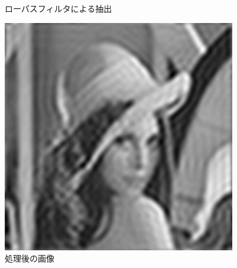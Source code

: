\begin{figure}[h]
\begin{minipage}{.25\hsize}
    \caption{ローパスフィルタによる抽出}
    \label{fig:low_pass_dft}
  \end{minipage}
  \begin{minipage}{.25\hsize}
    \includegraphics[clip, width=\textwidth]{figure/low_pass_idft_2d.pdf}
    \caption{処理後の画像}
    \label{fig:low_pass_idft}
  \end{minipage}
\end{figure}
\fi
